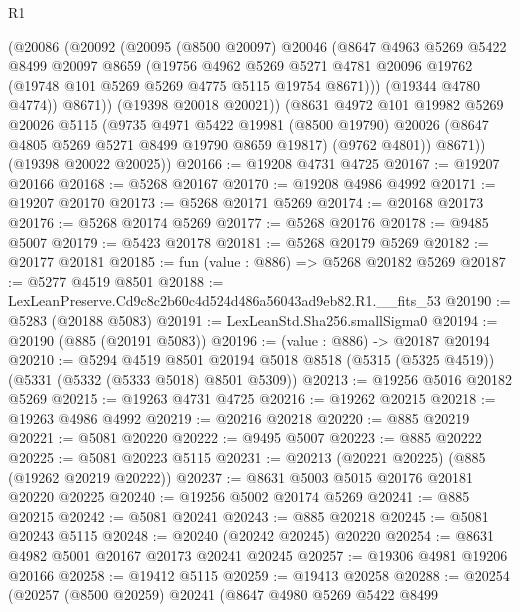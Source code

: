 \begin{lexlean}{R1}
\begin{coremodule}
          (@20086
            (@20092
              (@20095
                (@8500 @20097)
                @20046
                (@8647
                  @4963
                  @5269
                  @5422
                  @8499
                  @20097
                  @8659
                  (@19756
                    @4962
                    @5269
                    @5271
                    @4781
                    @20096
                    @19762
                    (@19748 @101 @5269 @5269 @4775 @5115 @19754 @8671)))
                (@19344 @4780 @4774))
              @8671))
          (@19398 @20018 @20021))
        (@8631
          @4972
          @101
          @19982
          @5269
          @20026
          @5115
          (@9735
            @4971
            @5422
            @19981
            (@8500 @19790)
            @20026
            (@8647 @4805 @5269 @5271 @8499 @19790 @8659 @19817)
            (@9762 @4801))
          @8671))
      (@19398 @20022 @20025))
@20166 := @19208 @4731 @4725
@20167 := @19207 @20166
@20168 := @5268 @20167
@20170 := @19208 @4986 @4992
@20171 := @19207 @20170
@20173 := @5268 @20171 @5269
@20174 := @20168 @20173
@20176 := @5268 @20174 @5269
@20177 := @5268 @20176
@20178 := @9485 @5007
@20179 := @5423 @20178
@20181 := @5268 @20179 @5269
@20182 := @20177 @20181
@20185 := fun (value : @886) => @5268 @20182 @5269
@20187 := @5277 @4519 @8501
@20188 := LexLeanPreserve.Cd9c8c2b60c4d524d486a56043ad9eb82.R1.__fits_53
@20190 := @5283 (@20188 @5083)
@20191 := LexLeanStd.Sha256.smallSigma0
@20194 := @20190 (@885 (@20191 @5083))
@20196 := (value : @886) -> @20187 @20194
@20210 := @5294
    @4519
    @8501
    @20194
    @5018
    @8518
    (@5315 (@5325 @4519))
    (@5331 (@5332 (@5333 @5018) @8501 @5309))
@20213 := @19256 @5016 @20182 @5269
@20215 := @19263 @4731 @4725
@20216 := @19262 @20215
@20218 := @19263 @4986 @4992
@20219 := @20216 @20218
@20220 := @885 @20219
@20221 := @5081 @20220
@20222 := @9495 @5007
@20223 := @885 @20222
@20225 := @5081 @20223 @5115
@20231 := @20213 (@20221 @20225) (@885 (@19262 @20219 @20222))
@20237 := @8631 @5003 @5015 @20176 @20181 @20220 @20225
@20240 := @19256 @5002 @20174 @5269
@20241 := @885 @20215
@20242 := @5081 @20241
@20243 := @885 @20218
@20245 := @5081 @20243 @5115
@20248 := @20240 (@20242 @20245) @20220
@20254 := @8631 @4982 @5001 @20167 @20173 @20241 @20245
@20257 := @19306 @4981 @19206 @20166
@20258 := @19412 @5115
@20259 := @19413 @20258
@20288 := @20254
    (@20257
      (@8500 @20259)
      @20241
      (@8647
        @4980
        @5269
        @5422
        @8499

\end{coremodule}
\end{lexlean}
